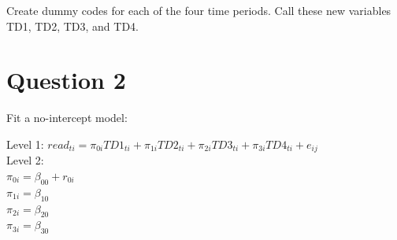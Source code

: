 \documentclass[]{article}
\newenvironment{Shaded}{\begin{snugshade}}{\end{snugshade}}
\newcommand{\KeywordTok}[1]{\textcolor[rgb]{0.13,0.29,0.53}{\textbf{#1}}}
\newcommand{\DataTypeTok}[1]{\textcolor[rgb]{0.13,0.29,0.53}{#1}}
\newcommand{\DecValTok}[1]{\textcolor[rgb]{0.00,0.00,0.81}{#1}}
\newcommand{\StringTok}[1]{\textcolor[rgb]{0.31,0.60,0.02}{#1}}
\newcommand{\OperatorTok}[1]{\textcolor[rgb]{0.81,0.36,0.00}{\textbf{#1}}}
\newcommand{\NormalTok}[1]{#1}
\begin{document}
Create dummy codes for each of the four time periods. Call these new
variables TD1, TD2, TD3, and TD4.

\begin{Shaded}
\end{Shaded}

\section{Question 2}\label{question-2}

Fit a no-intercept model:

Level 1:
\(read_{ti} = \pi_{0i}TD1_{ti} + \pi_{1i}TD2_{ti} + \pi_{2i}TD3_{ti} + \pi_{3i}TD4_{ti} + e_{ij}\)\\
Level 2:\\
\(\pi_{0i} = \beta_{00} + r_{0i}\)\\
\(\pi_{1i} = \beta_{10}\)\\
\(\pi_{2i} = \beta_{20}\)\\
\(\pi_{3i} = \beta_{30}\)
\end{document}
